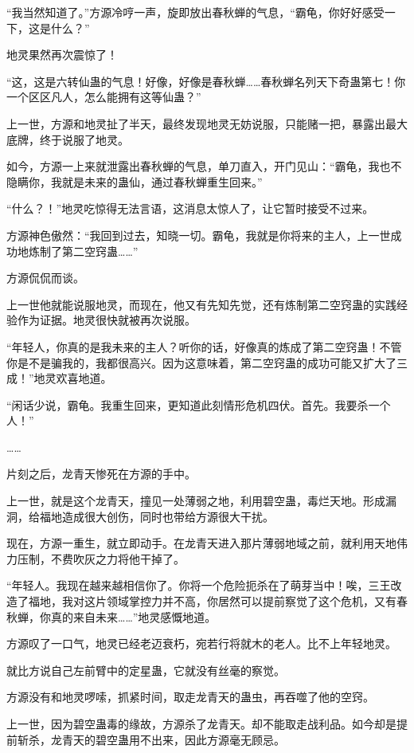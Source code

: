 \begin{this_body}
“我当然知道了。”方源冷哼一声，旋即放出春秋蝉的气息，“霸龟，你好好感受一下，这是什么？”

地灵果然再次震惊了！

“这，这是六转仙蛊的气息！好像，好像是春秋蝉……春秋蝉名列天下奇蛊第七！你一个区区凡人，怎么能拥有这等仙蛊？”

上一世，方源和地灵扯了半天，最终发现地灵无妨说服，只能赌一把，暴露出最大底牌，终于说服了地灵。

如今，方源一上来就泄露出春秋蝉的气息，单刀直入，开门见山：“霸龟，我也不隐瞒你，我就是未来的蛊仙，通过春秋蝉重生回来。”

“什么？！”地灵吃惊得无法言语，这消息太惊人了，让它暂时接受不过来。

方源神色傲然：“我回到过去，知晓一切。霸龟，我就是你将来的主人，上一世成功地炼制了第二空窍蛊……”

方源侃侃而谈。

上一世他就能说服地灵，而现在，他又有先知先觉，还有炼制第二空窍蛊的实践经验作为证据。地灵很快就被再次说服。

“年轻人，你真的是我未来的主人？听你的话，好像真的炼成了第二空窍蛊！不管你是不是骗我的，我都很高兴。因为这意味着，第二空窍蛊的成功可能又扩大了三成！”地灵欢喜地道。

“闲话少说，霸龟。我重生回来，更知道此刻情形危机四伏。首先。我要杀一个人！”

……

片刻之后，龙青天惨死在方源的手中。

上一世，就是这个龙青天，撞见一处薄弱之地，利用碧空蛊，毒烂天地。形成漏洞，给福地造成很大创伤，同时也带给方源很大干扰。

现在，方源一重生，就立即动手。在龙青天进入那片薄弱地域之前，就利用天地伟力压制，不费吹灰之力将他干掉了。

“年轻人。我现在越来越相信你了。你将一个危险扼杀在了萌芽当中！唉，三王改造了福地，我对这片领域掌控力并不高，你居然可以提前察觉了这个危机，又有春秋蝉，你真的来自未来……”地灵感慨地道。

方源叹了一口气，地灵已经老迈衰朽，宛若行将就木的老人。比不上年轻地灵。

就比方说自己左前臂中的定星蛊，它就没有丝毫的察觉。

方源没有和地灵啰嗦，抓紧时间，取走龙青天的蛊虫，再吞噬了他的空窍。

上一世，因为碧空蛊毒的缘故，方源杀了龙青天。却不能取走战利品。如今却是提前斩杀，龙青天的碧空蛊用不出来，因此方源毫无顾忌。


\end{this_body}
